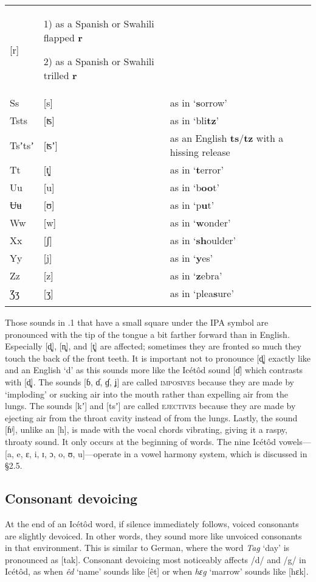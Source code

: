 \begin{table}
\begin{tabularx}{\textwidth}{XXX}
[r] & 1) as a Spanish or Swahili flapped \textbf{r}

2) as a Spanish or Swahili trilled \textbf{r}\\
Ss & [s] & as in ‘\textbf{s}orrow’\\
Tsts & [ʦ] & as in ‘bli\textbf{tz}’\\
Tsʼtsʼ & [ʦʼ] & as an English \textbf{ts}/\textbf{tz }with a hissing release\\
Tt & [t̻] & as in ‘\textbf{t}error’\\
Uu & [u] & as in ‘b\textbf{oo}t’\\
Ʉʉ & [ʊ] & as in ‘p\textbf{u}t’\\
Ww & [w] & as in ‘\textbf{w}onder’\\
Xx & [ʃ] & as in ‘\textbf{sh}oulder’\\
Yy & [j] & as in ‘\textbf{y}es’\\
Zz & [z] & as in ‘\textbf{z}ebra’\\
Ʒʒ & [ʒ] & as in ‘plea\textbf{s}ure’\\
\lspbottomrule
\end{tabularx}

\end{table}

Those sounds in .1 that have a small square under the IPA symbol are pronounced with the tip of the tongue a bit farther forward than in English. Especially [d̻], [n̻], and [t̻] are affected; sometimes they are fronted so much they touch the back of the front teeth. It is important not to pronounce [d̻] exactly like and an English ‘d’ as this sounds more like the Icétôd sound [ɗ] which contrasts with [d̻]. The sounds [ɓ, ɗ, ɠ, ʝ] are called \textsc{imposives} because they are made by ‘imploding’ or sucking air into the mouth rather than expelling air from the lungs. The sounds [kʼ] and [tsʼ] are called \textsc{ejectives} because they are made by ejecting air from the throat cavity instead of from the lungs. Lastly, the sound [ɦʲ], unlike an [h], is made with the vocal chords vibrating, giving it a raspy, throaty sound. It only occurs at the beginning of words. The nine Icétôd vowels—[a, e, ɛ, i, ɪ, ɔ, o, ʊ, u]—operate in a vowel harmony system, which is discussed in §2.5.
 
\subsection{Consonant devoicing}


At the end of an Icétôd word, if silence immediately follows, voiced consonants are slightly devoiced. In other words, they sound more like unvoiced consonants in that environment. This is similar to German, where the word \textit{Tag }‘day’ is pronounced as [tak]. Consonant devoicing most noticeably affects /d/ and /g/ in Icétôd, as when \textit{êd }‘name’ sounds like [êt] or when \textit{hɛg }‘marrow’\textit{ }sounds like [hɛk]. 
 
